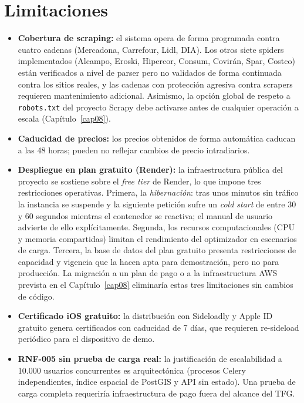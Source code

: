 \section{Limitaciones}\label{sec:limitaciones}

\begin{itemize}
  \item \textbf{Cobertura de scraping:} el sistema opera de forma programada contra cuatro
    cadenas (Mercadona, Carrefour, Lidl, DIA). Los otros siete spiders implementados (Alcampo,
    Eroski, Hipercor, Consum, Covir\'an, Spar, Costco) est\'an verificados a nivel de parser pero
    no validados de forma continuada contra los sitios reales, y las cadenas con protecci\'on
    agresiva contra scrapers requieren mantenimiento adicional. Asimismo, la opci\'on global de
    respeto a \texttt{robots.txt} del proyecto Scrapy debe activarse antes de cualquier
    operaci\'on a escala (Cap\'itulo~\ref{cap08}).

  \item \textbf{Caducidad de precios:} los precios obtenidos de forma autom\'atica caducan a las
    48 horas; pueden no reflejar cambios de precio intradiarios.

  \item \textbf{Despliegue en plan gratuito (Render):} la infraestructura p\'ublica del
    proyecto se sostiene sobre el \emph{free tier} de Render, lo que impone tres restricciones
    operativas. Primera, la \emph{hibernaci\'on}: tras unos minutos sin tr\'afico la instancia
    se suspende y la siguiente petici\'on sufre un \emph{cold start} de entre 30 y 60 segundos
    mientras el contenedor se reactiva; el manual de usuario advierte de ello expl\'icitamente.
    Segunda, los recursos computacionales (CPU y memoria compartidas) limitan el rendimiento del
    optimizador en escenarios de carga. Tercera, la base de datos del plan gratuito presenta
    restricciones de capacidad y vigencia que la hacen apta para demostraci\'on, pero no para
    producci\'on. La migraci\'on a un plan de pago o a la infraestructura AWS prevista en el
    Cap\'itulo~\ref{cap08} eliminar\'ia estas tres limitaciones sin cambios de c\'odigo.

  \item \textbf{Certificado iOS gratuito:} la distribuci\'on con Sideloadly y Apple ID gratuito
    genera certificados con caducidad de 7 d\'ias, que requieren re-sideload peri\'odico para el
    dispositivo de demo.

  \item \textbf{RNF-005 sin prueba de carga real:} la justificaci\'on de escalabilidad a 10.000
    usuarios concurrentes es arquitect\'onica (procesos Celery independientes, \'indice espacial de
    PostGIS y API sin estado). Una prueba de carga completa requerir\'ia infraestructura de pago
    fuera del alcance del TFG.


\end{itemize}
